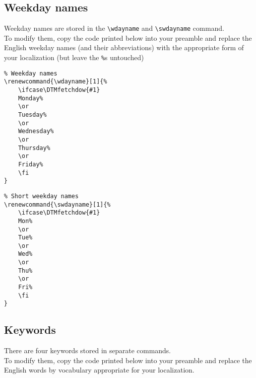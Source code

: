 \documentclass[11pt]{ltxdoc}
\begin{document}
	
	\subsection{Weekday names}
	Weekday names are stored in the \verb|\wdayname| and \verb|\swdayname| command. \\
	To modify them, copy the code printed below into your preamble and replace the English weekday names (and their abbreviations) with the appropriate form of your localization (but leave the \verb|%|s untouched)
	
	\medskip
	\verb|% Weekday names| \\
	\verb|\renewcommand{\wdayname}[1]{%| \\
	\verb|    \ifcase\DTMfetchdow{#1}| \\
	\verb|    Monday%| \\
	\verb|    \or| \\
	\verb|    Tuesday%| \\
	\verb|    \or| \\
	\verb|    Wednesday%| \\
	\verb|    \or| \\
	\verb|    Thursday%| \\
	\verb|    \or| \\
	\verb|    Friday%| \\
	\verb|    \fi| \\
	\verb|}|
	
	\bigskip
	\verb|% Short weekday names| \\
	\verb|\renewcommand{\swdayname}[1]{%| \\
	\verb|    \ifcase\DTMfetchdow{#1}| \\
	\verb|    Mon%| \\
	\verb|    \or| \\
	\verb|    Tue%| \\
	\verb|    \or| \\
	\verb|    Wed%| \\
	\verb|    \or| \\
	\verb|    Thu%| \\
	\verb|    \or| \\
	\verb|    Fri%| \\
	\verb|    \fi| \\
	\verb|}|
	
	
	\subsection{Keywords}
	There are four keywords stored in separate commands. \\
	To modify them, copy the code printed below into your preamble and replace the English words by vocabulary appropriate for your localization.
	
\end{document}
